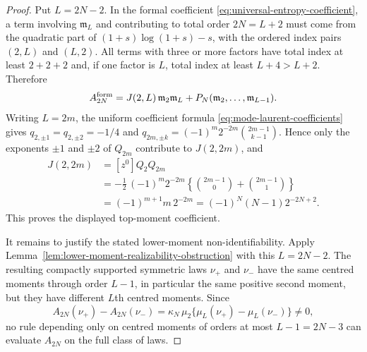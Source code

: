 \begin{proof}
Put \(L=2N-2\).  In the formal coefficient
\eqref{eq:universal-entropy-coefficient}, a term involving
\(\mathfrak m_L\) and contributing to total order \(2N=L+2\) must come from
the quadratic part of
\((1+s)\log(1+s)-s\), with the ordered index pairs \((2,L)\) and \((L,2)\).
All terms with three or more factors have total index at least \(2+2+2\) and,
if one factor is \(L\), total index at least \(L+4> L+2\).  Therefore
\[
  A_{2N}^{\rm form}
  =J(2,L)\,\mathfrak m_2\mathfrak m_L
  +P_N(\mathfrak m_2,\ldots,\mathfrak m_{L-1}).
\]
Writing \(L=2m\), the uniform coefficient formula
\eqref{eq:mode-laurent-coefficients} gives
\(q_{2,\pm1}=q_{2,\pm2}=-1/4\) and
\(q_{2m,\pm k}=(-1)^m2^{-2m}\binom{2m-1}{k-1}\).  Hence only the exponents
\(\pm1\) and \(\pm2\) of \(Q_{2m}\) contribute to \(J(2,2m)\), and
\[
\begin{aligned}
J(2,2m)
&=[z^0]Q_2Q_{2m}  \\
&=-\frac12\,(-1)^m2^{-2m}
\left\{\binom{2m-1}{0}+\binom{2m-1}{1}\right\}  \\
&=(-1)^{m+1}m\,2^{-2m}
=(-1)^N(N-1)2^{-2N+2}.
\end{aligned}
\]
This proves the displayed top-moment coefficient.

It remains to justify the stated lower-moment non-identifiability.  Apply
Lemma~\ref{lem:lower-moment-realizability-obstruction} with this
\(L=2N-2\).  The resulting compactly supported symmetric laws \(\nu_+\) and
\(\nu_-\) have the same centred moments through order \(L-1\), in particular
the same positive second moment, but they have different \(L\)th centred
moments.  Since
\[
  A_{2N}(\nu_+)-A_{2N}(\nu_-)
  =\kappa_N\,\mu_2\{\mu_L(\nu_+)-\mu_L(\nu_-)\}
  \ne0,
\]
no rule depending only on centred moments of orders at most \(L-1=2N-3\)
can evaluate \(A_{2N}\) on the full class of laws.
\end{proof}

